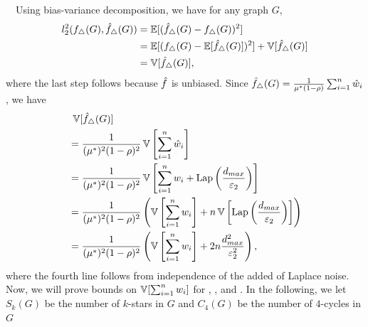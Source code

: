 {%
\smallskip
{}~~Using bias-variance decomposition, we have
for any graph $G$,
\begin{align*}
  l_2^2(f_\triangle(G), \hat{f}_\triangle(G)) &= \operatorname{\mathbb{E}}[(\hat{f}_\triangle(G) - f_\triangle(G))^2] \\
  &= \operatorname{\mathbb{E}}[(f_\triangle(G) - \operatorname{\mathbb{E}}[\hat{f}_\triangle(G)])^2] + \operatorname{\mathbb{V}}[\hat{f}_\triangle(G)] \\
  &= \operatorname{\mathbb{V}}[\hat{f}_\triangle(G)],
\end{align*}
where the last step follows because $\hat{f}$ is unbiased.
Since $\hat{f}_\triangle(G) = \frac{1}{\mu^*(1-\rho)} \sum_{i=1}^n \hat{w}_i$, we have
\begin{align}
  &\;\operatorname{\mathbb{V}}[\hat{f}_\triangle(G)] \nonumber \\
  &= \frac{1}{(\mu^*)^2(1-\rho)^2}\operatorname{\mathbb{V}}\left[\sum_{i=1}^n \hat{w}_i\right] \nonumber \\
  &= \frac{1}{(\mu^*)^2(1-\rho)^2}\operatorname{\mathbb{V}}\left[\sum_{i=1}^n w_i + \textrm{Lap}\left(\frac{d_{max}}{\varepsilon_2} \right)\right] \nonumber \\
  &= \frac{1}{(\mu^*)^2(1-\rho)^2}\left(\operatorname{\mathbb{V}}\left[\sum_{i=1}^n w_i\right] +
  n\operatorname{\mathbb{V}}\left[\textrm{Lap}\left(\frac{d_{max}}{\varepsilon_2}\right)\right]\right) \nonumber \\
  &= \frac{1}{(\mu^*)^2(1-\rho)^2}\left(\operatorname{\mathbb{V}}\left[\sum_{i=1}^n w_i\right] +
  2n\frac{d_{max}^2}{\varepsilon_2^2}\right), \label{chap2-eq:inter_var}
\end{align}
where the
fourth
line follows from independence of the added of Laplace noise.
Now, we will prove bounds on $\operatorname{\mathbb{V}}[\sum_{i=1}^nw_i]$ for \AlgOne{}, \AlgTwo{}, and
\AlgThree{}. In the following, we let $S_k(G)$ be the number of $k$-stars in
$G$ and $C_4(G)$ be the number of $4$-cycles in $G$

}
